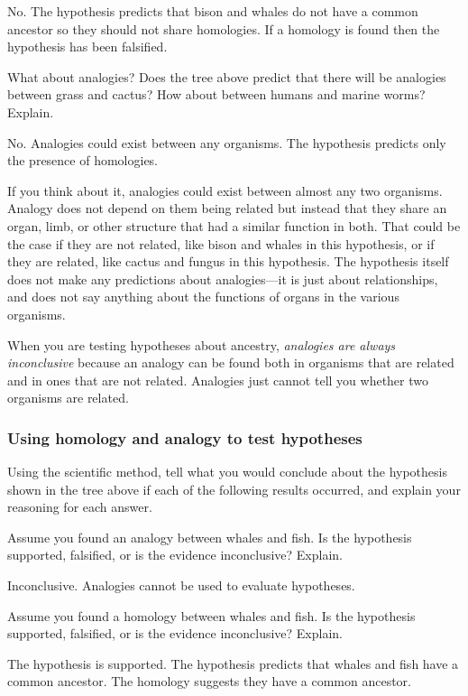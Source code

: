 \documentclass[12pt, addpoints, hidelinks]{exam}
\newcommand*\AnswerBox[2]{%
    \parbox[t][#1]{0.92\textwidth}{%
    \begin{solution}#2\end{solution}}
}
\begin{document}
\begin{questions}
\AnswerBox{4\baselineskip}{No. The hypothesis predicts that bison and whales do
not have a common ancestor so they should not share homologies. If a homology is found
then the hypothesis has been falsified.}

\question[1]
What about analogies? Does the tree above predict that there
will be analogies between grass and cactus? How about between humans and
marine worms? Explain.

\AnswerBox{4\baselineskip}{No. Analogies could exist between any organisms. 
The hypothesis predicts only the presence of homologies.}

If you think about it, analogies could exist between almost any two
organisms. Analogy does not depend on them being related but instead that they
share an organ, limb, or other structure that had a similar function in both. That could be
the case if they are not related, like bison and whales in this
hypothesis, or if they are related, like cactus and fungus in this
hypothesis. The hypothesis itself does not make any predictions about
analogies---it is just about relationships, and does not say anything
about the functions of organs in the various organisms.

When you are testing hypotheses about ancestry, \emph{analogies are 
always inconclusive} because an analogy can be found both in 
organisms that are related and in ones that are not
related. Analogies just cannot tell you whether two organisms are related.

%

\subsubsection*{Using homology and analogy to test hypotheses}

Using the scientific method, tell what you would conclude about
the hypothesis shown in the tree above if each of the following results
occurred, and explain your reasoning for each answer.

\question[1]
Assume you found an analogy between whales and fish. Is the hypothesis supported, falsified, or is the evidence inconclusive? Explain.

\AnswerBox{4\baselineskip}{Inconclusive. Analogies cannot be used to evaluate hypotheses.}


\question[1]
Assume you found a homology between whales and fish. Is the hypothesis supported, falsified, or is the evidence inconclusive? Explain.

\AnswerBox{4\baselineskip}{The hypothesis is supported. The hypothesis predicts that whales and fish have a common ancestor. The homology suggests they have a common ancestor.}



\end{questions}
\end{document}
